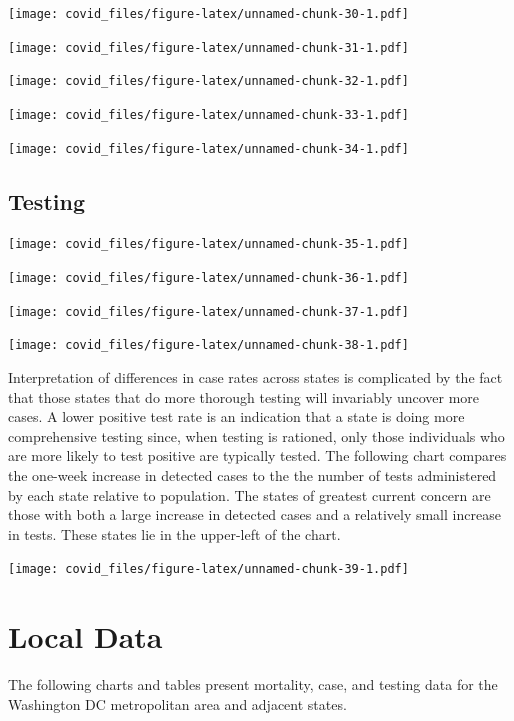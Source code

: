 \documentclass[]{article}
\begin{document}
\texttt{[image: covid\_files/figure-latex/unnamed-chunk-30-1.pdf]}

\texttt{[image: covid\_files/figure-latex/unnamed-chunk-31-1.pdf]}

\texttt{[image: covid\_files/figure-latex/unnamed-chunk-32-1.pdf]}
\newpage

\texttt{[image: covid\_files/figure-latex/unnamed-chunk-33-1.pdf]}

\texttt{[image: covid\_files/figure-latex/unnamed-chunk-34-1.pdf]}

\newpage

\hypertarget{testing-1}{%
\subsection{Testing}\label{testing-1}}

\texttt{[image: covid\_files/figure-latex/unnamed-chunk-35-1.pdf]}

\texttt{[image: covid\_files/figure-latex/unnamed-chunk-36-1.pdf]}

\newpage

\texttt{[image: covid\_files/figure-latex/unnamed-chunk-37-1.pdf]}

\texttt{[image: covid\_files/figure-latex/unnamed-chunk-38-1.pdf]}
\newpage

Interpretation of differences in case rates across states is complicated
by the fact that those states that do more thorough testing will
invariably uncover more cases. A lower positive test rate is an
indication that a state is doing more comprehensive testing since, when
testing is rationed, only those individuals who are more likely to test
positive are typically tested. The following chart compares the one-week
increase in detected cases to the the number of tests administered by
each state relative to population. The states of greatest current
concern are those with both a large increase in detected cases and a
relatively small increase in tests. These states lie in the upper-left
of the chart.

\texttt{[image: covid\_files/figure-latex/unnamed-chunk-39-1.pdf]}

\newpage

\hypertarget{local-data}{%
\section{Local Data}\label{local-data}}

The following charts and tables present mortality, case, and testing
data for the Washington DC metropolitan area and adjacent states.
\end{document}
